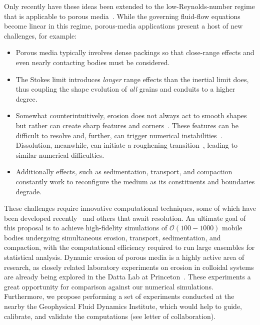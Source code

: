 \documentclass[11pt]{article}
\begin{document}
Only recently have these ideas been extended to the low-Reynolds-number regime that is applicable to porous media~\cite{mitchell2017generalized, Quaife2018}. While the governing fluid-flow equations become linear in this regime, porous-media applications present a host of new challenges, for example:
\begin{itemize}[noitemsep]
\item Porous media typically involves dense packings so that close-range effects and even nearly contacting bodies must be considered.

\item The Stokes limit introduces {\em longer} range effects than the inertial limit does, thus coupling the shape evolution of {\em all} grains and conduits to a higher degree.

\item Somewhat counterintuitively, erosion does not always act to smooth shapes but rather can create sharp features and corners~\cite{Ristroph2012}. These features can be difficult to resolve and, further, can trigger numerical instabilities~\cite{Quaife2018}. Dissolution, meanwhile, can initiate a roughening transition~\cite{claudin2017dissolution}, leading to similar numerical difficulties.

\item Additionally effects, such as sedimentation, transport, and compaction constantly work to reconfigure the medium as its constituents and boundaries degrade.
\end{itemize}
These challenges require innovative computational techniques, some of which have been developed recently~\cite{Quaife2018} and others that await resolution. An ultimate goal of this proposal is to achieve high-fidelity simulations of $\mathcal{O}(100-1000)$ mobile bodies undergoing simultaneous erosion, transport, sedimentation, and compaction, with the computational efficiency required to run large ensembles for statistical analysis. Dynamic erosion of porous media is a highly active area of research, as closely related laboratory experiments on erosion in colloidal systems are already being explored in the Datta Lab at Princeton~\cite{bizmark2019multiscale}. These experiments a great opportunity for comparison against our numerical simulations. Furthermore, we propose performing a set of experiments conducted at the nearby the Geophysical Fluid Dynamics Institute, which would help to guide, calibrate, and validate the computations (see letter of collaboration).
\end{document}
